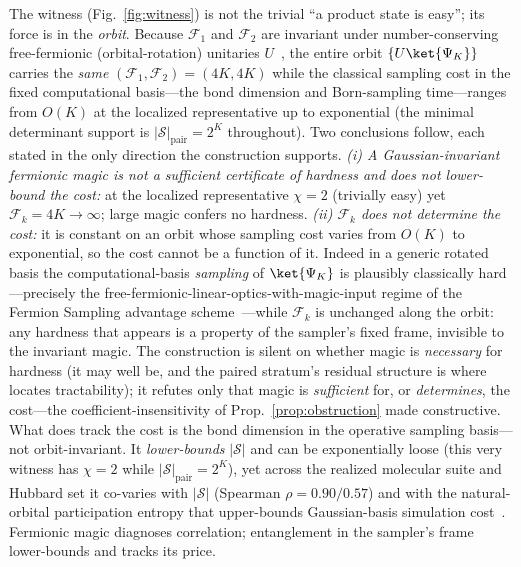 \noindent The witness (Fig.~\ref{fig:witness}) is not the trivial ``a product state is easy''; its force is in the \emph{orbit}.
Because $\mathcal F_1$ and $\mathcal F_2$ are invariant under number-conserving free-fermionic
(orbital-rotation) unitaries $U$~\cite{sierant2026}, the entire orbit $\{U\ket{\Psi_K}\}$ carries the
\emph{same} $(\mathcal F_1,\mathcal F_2)=(4K,4K)$ while the classical sampling cost in the fixed
computational basis---the bond dimension and Born-sampling time---ranges from $O(K)$ at the localized
representative up to exponential (the minimal determinant support is $|\mathcal S|_{\mathrm{pair}}=2^{K}$
throughout). Two conclusions follow, each stated
in the only direction the construction supports. \emph{(i) A Gaussian-invariant fermionic magic is not a
sufficient certificate of hardness and does not lower-bound the cost:} at the localized representative
$\chi=2$ (trivially easy) yet $\mathcal F_k=4K\to\infty$; large magic confers no hardness. \emph{(ii)
$\mathcal F_k$ does not determine the cost:} it is constant on an orbit whose sampling cost varies from
$O(K)$ to exponential, so the cost cannot be a function of it. Indeed in a generic rotated basis the
computational-basis \emph{sampling} of $\ket{\Psi_K}$ is plausibly classically hard---precisely the
free-fermionic-linear-optics-with-magic-input regime of the Fermion Sampling advantage
scheme~\cite{fermionsampling2022}---while $\mathcal F_k$ is unchanged along the orbit: any hardness that
appears is a property of the sampler's fixed frame, invisible to the invariant magic. The construction is
silent on whether magic is \emph{necessary} for hardness (it may well be, and the paired stratum's
residual structure is where~\cite{oh2026} locates tractability); it refutes only that magic is
\emph{sufficient} for, or \emph{determines}, the cost---the coefficient-insensitivity of
Prop.~\ref{prop:obstruction} made constructive. What does track the cost is the bond dimension in the
operative sampling basis---not orbit-invariant. It \emph{lower-bounds} $|\mathcal S|$ and can be
exponentially loose (this very witness has $\chi=2$ while $|\mathcal S|_{\mathrm{pair}}=2^{K}$), yet
across the realized molecular suite and Hubbard set it co-varies with $|\mathcal S|$ (Spearman
$\rho=0.90/0.57$) and with the natural-orbital participation entropy that upper-bounds Gaussian-basis
simulation cost~\cite{tarabunga2026}. Fermionic magic diagnoses correlation; entanglement in the sampler's frame
lower-bounds and tracks its price.

